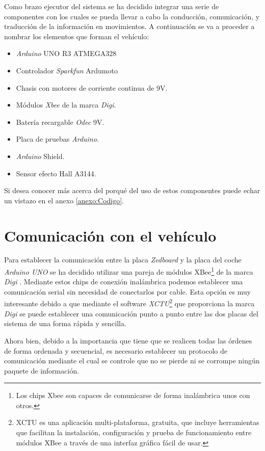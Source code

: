 Como brazo ejecutor del sistema se ha decidido integrar una serie de componentes con los cuales se pueda llevar a cabo la conducción, comunicación, y traducción de la información en movimientos. A continuación se va a proceder a nombrar los elementos que forman el vehículo:

\begin{itemize}
\item \emph{Arduino} UNO R3 ATMEGA328
\item Controlador \emph{Sparkfun} Ardumoto
\item Chasis con motores de corriente continua de 9V.
\item Módulos \emph{Xbee} de la marca \emph{Digi}.
\item Batería recargable \emph{Odec} 9V.
\item Placa de pruebas \emph{Arduino}.
\item \emph{Arduino} Shield. 
\item Sensor efecto Hall A3144.
\end{itemize}

Si desea conocer más acerca del porqué del uso de estos componentes puede echar un vistazo en el anexo \ref{anexo:Codigo}.

\section{Comunicación con el vehículo}\label{sec:Comunicacion}

Para establecer la comunicación entre la placa \emph{Zedboard} y la placa del coche \emph{Arduino UNO} se ha decidido utilizar una pareja de módulos XBee\footnote{Los chips Xbee son capaces de comunicarse de forma inalámbrica unos con otros.} de la marca \emph{Digi} \cite{Digi}. Mediante estos chips de conexión inalámbrica podemos establecer una comunicación serial sin necesidad de conectarlos por cable. Esta opción es muy interesante debido a que mediante el software \emph{XCTU}\footnote{XCTU \cite{XCTU} es una aplicación multi-plataforma, gratuita, que incluye herramientas que facilitan la instalación, configuración y prueba de funcionamiento entre módulos XBee a través de una interfaz gráfica fácil de usar.} que proporciona la marca \emph{Digi} se puede establecer una comunicación punto a punto entre las dos placas del sistema de una forma rápida y sencilla.

Ahora bien, debido a la importancia que tiene que se realicen todas las órdenes de forma ordenada y secuencial, es necesario establecer un protocolo de comunicación mediante el cual se controle que no se pierde ni se corrompe ningún paquete de información.

